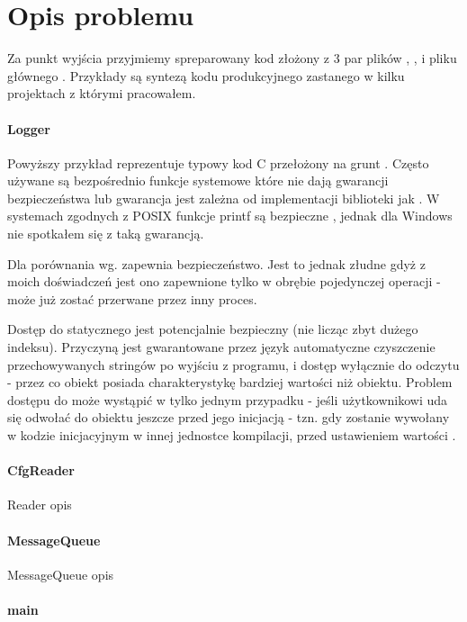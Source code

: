 \section{Opis problemu}
Za punkt wyjścia przyjmiemy spreparowany kod złożony z 3 par plików , ,  i pliku głównego .
Przykłady są syntezą kodu produkcyjnego zastanego w kilku projektach z którymi pracowałem. 

\paragraph{Logger}
Powyższy przykład reprezentuje typowy kod C przełożony na grunt \Cpp{}. Często używane są bezpośrednio funkcje systemowe które nie dają gwarancji bezpieczeństwa lub gwarancja jest zależna od implementacji biblioteki jak . W systemach zgodnych z POSIX funkcje printf są bezpieczne , jednak dla Windows nie spotkałem się z taką gwarancją.

Dla porównania wg.   zapewnia bezpieczeństwo. Jest to jednak złudne gdyż z moich doświadczeń jest ono zapewnione tylko w obrębie pojedynczej operacji -  może już zostać przerwane przez inny proces.

Dostęp do statycznego  jest potencjalnie bezpieczny (nie licząc zbyt dużego indeksu). Przyczyną jest gwarantowane przez język automatyczne czyszczenie przechowywanych stringów po wyjściu z programu, i dostęp wyłącznie do odczytu - przez co obiekt posiada charakterystykę bardziej wartości niż obiektu. Problem dostępu do  może wystąpić w tylko jednym przypadku - jeśli użytkownikowi uda się odwołać do obiektu jeszcze przed jego inicjacją - tzn. gdy  zostanie wywołany w kodzie inicjacyjnym w innej jednostce kompilacji, przed ustawieniem wartości .
\paragraph{CfgReader}
Reader opis

\paragraph{MessageQueue}
MessageQueue opis

\paragraph{main}
